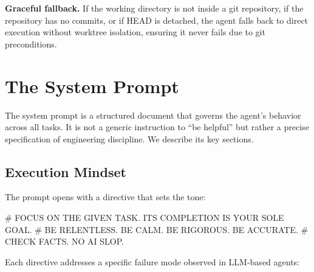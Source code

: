 \documentclass{article}
\begin{document}
\textbf{Graceful fallback.}  If the working directory is not inside a
git repository, if the repository has no commits, or if HEAD is
detached, the agent falls back to direct execution without worktree
isolation, ensuring it never fails due to git preconditions.

\section{The System Prompt}
\label{sec:system-prompt}

The system prompt is a structured document that governs the agent's
behavior across all tasks.  It is not a generic instruction to ``be
helpful'' but rather a precise specification of engineering discipline.
We describe its key sections.

\subsection{Execution Mindset}

The prompt opens with a directive that sets the tone:

\begin{prompt}
# FOCUS ON THE GIVEN TASK. ITS COMPLETION IS YOUR SOLE GOAL.
# BE RELENTLESS. BE CALM. BE RIGOROUS. BE ACCURATE.
# CHECK FACTS. NO AI SLOP.
\end{prompt}

\noindent Each directive addresses a specific failure mode observed in
LLM-based agents:
\end{document}
